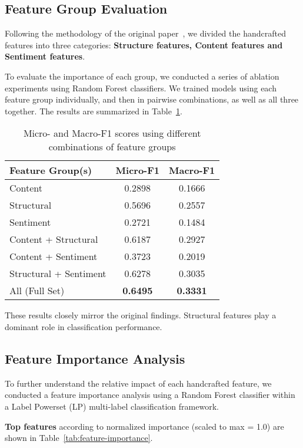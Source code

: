 \documentclass{article}
\begin{document}
\subsection{Feature Group Evaluation}

Following the methodology of the original paper~\cite{qu2019user}, we divided the handcrafted features into three categories: \textbf{Structure features, Content features and Sentiment features}.

To evaluate the importance of each group, we conducted a series of ablation experiments using Random Forest classifiers. We trained models using each feature group individually, and then in pairwise combinations, as well as all three together. The results are summarized in Table~\ref{tab:feature-groups}.

\begin{table}[H]
\centering
\caption{Micro- and Macro-F1 scores using different combinations of feature groups}
\label{tab:feature-groups}
\begin{tabular}{lcc}
\toprule
\textbf{Feature Group(s)} & \textbf{Micro-F1} & \textbf{Macro-F1} \\
\midrule
Content          & 0.2898 & 0.1666 \\
Structural       & 0.5696 & 0.2557 \\
Sentiment        & 0.2721 & 0.1484 \\
Content + Structural & 0.6187 & 0.2927 \\
Content + Sentiment  & 0.3723 & 0.2019 \\
Structural + Sentiment & 0.6278 & 0.3035 \\
All (Full Set)    & \textbf{0.6495} & \textbf{0.3331} \\
\bottomrule
\end{tabular}
\end{table}

These results closely mirror the original findings. Structural features play a dominant role in classification performance. 

\subsection{Feature Importance Analysis}
To further understand the relative impact of each handcrafted feature, we conducted a feature importance analysis using a Random Forest classifier within a Label Powerset (LP) multi-label classification framework.

\textbf{Top features} according to normalized importance (scaled to max = 1.0) are shown in Table~\ref{tab:feature-importance}.
\end{document}
